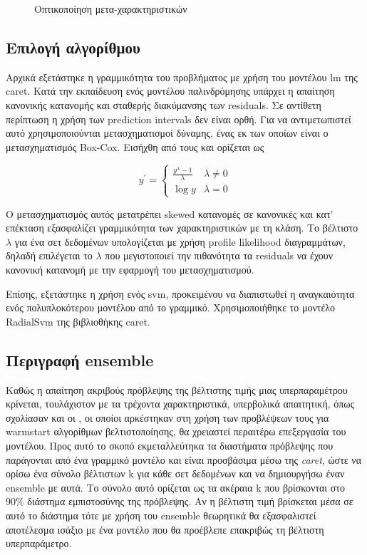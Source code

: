 \documentclass[]{article}
\numberwithin{equation}{section}		%
\numberwithin{figure}{section}			%
\numberwithin{table}{section}				%
\begin{document}
\begin{figure}[H]
    	\caption{Οπτικοποίηση μετα-χαρακτηριστικών} \label{fig:1}
    \end{figure}
    
    \subsection{Επιλογή αλγορίθμου}    
    
    Αρχικά εξετάστηκε η γραμμικότητα του προβλήματος με χρήση του μοντέλου lm της caret. Κατά την εκπαίδευση ενός μοντέλου παλινδρόμησης υπάρχει η απαίτηση κανονικής κατανομής και σταθερής διακύμανσης των residuals. Σε αντίθετη περίπτωση η χρήση των prediction intervals δεν είναι ορθή. Για να αντιμετωπιστεί αυτό χρησιμοποιούνται μετασχηματισμοί δύναμης, ένας εκ των οποίων είναι ο μετασχηματισμός Box-Cox. Εισήχθη από τους \citet{10.2307/2984418} και ορίζεται ως
    
    \begin{equation}
    y^{'}=
    \begin{cases}
    \frac{y^{\lambda} -1}{\lambda} &  \lambda \neq 0\\
    \log{y} & \lambda = 0
    \end{cases}
    \end{equation} 
    
    Ο μετασχηματισμός αυτός μετατρέπει skewed κατανομές σε κανονικές και κατ' επέκταση εξασφαλίζει γραμμικότητα των χαρακτηριστικών με τη κλάση. Το βέλτιστο $\lambda$ για ένα σετ δεδομένων υπολογίζεται με χρήση profile likelihood διαγραμμάτων, δηλαδή επιλέγεται το $\lambda$ που μεγιστοποιεί την πιθανότητα τα residuals να έχουν κανονική κατανομή με την εφαρμογή του μετασχηματισμού.
    
    Επίσης, εξετάστηκε η χρήση ενός svm, προκειμένου να διαπιστωθεί η αναγκαιότητα ενός πολυπλοκότερου μοντέλου από το γραμμικό. Χρησιμοποιήθηκε το μοντέλο RadialSvm της βιβλιοθήκης caret.
    
   \subsection{Περιγραφή ensemble} Καθώς η απαίτηση ακριβούς πρόβλεψης της βέλτιστης τιμής μιας υπερπαραμέτρου κρίνεται, τουλάχιστον με τα τρέχοντα χαρακτηριστικά, υπερβολικά απαιτητική, όπως σχολίασαν και οι \citet{Feurer:2014:UMI:3015544.3015549}, οι οποίοι αρκέστηκαν στη χρήση των προβλέψεων τους για warmstart αλγορίθμων βελτιστοποίησης, θα χρειαστεί περαιτέρω επεξεργασία του μοντέλου. Προς αυτό το σκοπό εκμεταλλεύτηκα τα διαστήματα πρόβλεψης που παράγονται από ένα γραμμικό μοντέλο και είναι προσβάσιμα μέσω της \textit{caret}, ώστε να ορίσω ένα σύνολο βέλτιστων k για κάθε σετ δεδομένων και να δημιουργήσω έναν ensemble με αυτά. Το σύνολο αυτό ορίζεται ως τα ακέραια k που βρίσκονται στο $90\%$ διάστημα εμπιστοσύνης της πρόβλεψης. Αν η βέλτιστη τιμή βρίσκεται μέσα σε αυτό το διάστημα τότε με χρήση του ensemble θεωρητικά θα εξασφαλιστεί αποτέλεσμα ισάξιο με ένα μοντέλο που θα προέβλεπε επακριβώς τη βέλτιστη υπερπαράμετρο. 
   
\end{document}
